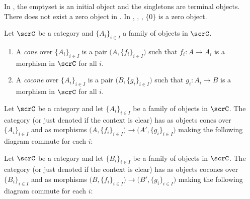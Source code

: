 \begin{example}
	In , the emptyset is an initial object and the singletons are terminal objects. There does not exist a zero object in . In , , , $\{0\}$ is a zero object.
\end{example}

\begin{definition}
	Let $\scrC$ be a category and $\{A_i\}_{i \in I}$ a family of objects in $\scrC$.
	\mbox{}
	\begin{enumerate}[label = (\arabic*),itemsep=1pt,topsep=3pt]
		\item A \emph{cone} over $\{A_i\}_{i \in I}$ is a pair $\bigl( A,\{f_i\}_{i \in I} \bigr)$ such that $f_i:A \rightarrow A_i$ is a morphism in $\scrC$ for all $i$.
		\item A \emph{cocone} over $\{A_i\}_{i \in I}$ is a pair $\bigl( B, \{g_i\}_{i \in I} \bigr)$ such that $g_i:A_i \rightarrow B$ is a morphism in $\scrC$ for all $i$.
	\end{enumerate}
\end{definition}

\begin{example}
	Let $\scrC$ be a category and let $\{A_i\}_{i \in I}$ be a family of objects in $\scrC$. The category  (or just denoted  if the context is clear) has as objects cones over $\{A_i\}_{i \in I}$ and as morphisms $\bigl( A,\{f_i\}_{i \in I} \bigr) \rightarrow \bigl( A', \{g_i\}_{i \in I} \bigr)$ making the following diagram commute for each $i$:
	\begin{center}
	\end{center}
\end{example}

\begin{example}
	Let $\scrC$ be a category and let $\{B_i\}_{i \in I}$ be a family of objects in $\scrC$. The category  (or just denoted  if the context is clear) has as objects cocones over $\{B_i\}_{i \in I}$ and as morphisms $\bigl( B,\{f_i\}_{i \in I} \bigr) \rightarrow \bigl( B', \{g_i\}_{i \in I} \bigr)$ making the following diagram commute for each $i$:
	\begin{center}
	\end{center}
\end{example}

